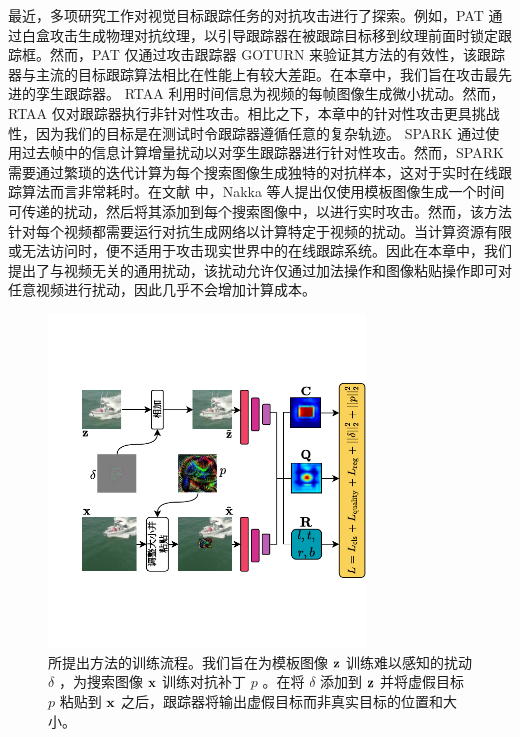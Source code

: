 最近，多项研究工作对视觉目标跟踪任务的对抗攻击进行了探索。例如，PAT \cite{PAT} 通过白盒攻击生成物理对抗纹理，以引导跟踪器在被跟踪目标移到纹理前面时锁定跟踪框。然而，PAT 仅通过攻击跟踪器 GOTURN \cite{GOTURN} 来验证其方法的有效性，该跟踪器与主流的目标跟踪算法相比在性能上有较大差距。在本章中，我们旨在攻击最先进的孪生跟踪器。
RTAA \cite{RTAA} 利用时间信息为视频的每帧图像生成微小扰动。然而，RTAA 仅对跟踪器执行非针对性攻击。相比之下，本章中的针对性攻击更具挑战性，因为我们的目标是在测试时令跟踪器遵循任意的复杂轨迹。
SPARK \cite{SPARK} 通过使用过去帧中的信息计算增量扰动以对孪生跟踪器进行针对性攻击。然而，SPARK 需要通过繁琐的迭代计算为每个搜索图像生成独特的对抗样本，这对于实时在线跟踪算法而言非常耗时。在文献 \cite{TTP} 中，Nakka 等人提出仅使用模板图像生成一个时间可传递的扰动，然后将其添加到每个搜索图像中，以进行实时攻击。然而，该方法针对每个视频都需要运行对抗生成网络以计算特定于视频的扰动。当计算资源有限或无法访问时，便不适用于攻击现实世界中的在线跟踪系统。因此在本章中，我们提出了与视频无关的通用扰动，该扰动允许仅通过加法操作和图像粘贴操作即可对任意视频进行扰动，因此几乎不会增加计算成本。

\begin{figure}[t]
\centering
\includegraphics[width=0.75\textwidth]{Img/attack/network_v5.pdf}
\caption{所提出方法的训练流程。我们旨在为模板图像 $\textbf z$ 训练难以感知的扰动 $\delta$ ，为搜索图像 $\textbf x$ 训练对抗补丁 $p$ 。在将 $\delta$ 添加到 $\textbf z$ 并将虚假目标 $p$ 粘贴到 $\textbf x$ 之后，跟踪器将输出虚假目标而非真实目标的位置和大小。}
\label{fig:net}
\end{figure}

